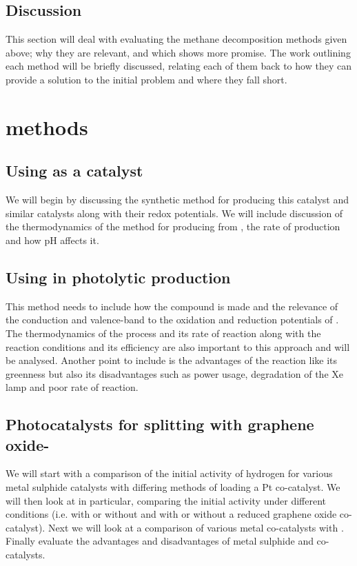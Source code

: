 \documentclass[a4paper]{article}
\begin{document}
\subsection{Discussion}%
\label{sub:discussion_meth}
This section will deal with evaluating the methane decomposition methods given above; why they are relevant, and which shows more promise.
The work outlining each method will be briefly discussed, relating each of them back to how they can provide a solution to the initial problem and where they fall short. 

\section{ methods}%
\label{sub:h2o_methods}

\subsection{Using  as a catalyst}%
\label{sub:Using_ce_Co_N4_Py_H2O_PF6_3_as_a_catalyst}
We will begin by discussing the synthetic method for producing this catalyst and similar catalysts along with their redox potentials.
We will include discussion of the thermodynamics of the method for producing  from , the rate of  production and how pH affects it.

\subsection{Using  in photolytic  production}%
\label{sub:Using_ce_GaN_in_photolytic_ce_H2_production}
This method needs to include how the compound is made and the relevance of the conduction and valence-band to the oxidation and reduction potentials of . 
The thermodynamics of the process and its rate of reaction along with the reaction conditions and its efficiency are also important to this approach and will be analysed.
Another point to include is the advantages of the reaction like its greenness but also its disadvantages such as power usage, degradation of the Xe lamp and poor rate of reaction.

\subsection{Photocatalysts for  splitting with graphene oxide-}%
\label{sub:Photocatalysts_for_ce_H2O_splitting_with_graphene_oxide}
We will start with a comparison of the initial activity of hydrogen for various metal sulphide catalysts with differing  methods of loading a Pt co-catalyst. 
We will then look at  in particular, comparing the initial  activity under different conditions (i.e. with or without  and with or without a reduced graphene oxide  co-catalyst).
Next we will look at a comparison of various metal co-catalysts with .
Finally evaluate the advantages and disadvantages of metal sulphide and  co-catalysts.
\end{document}
